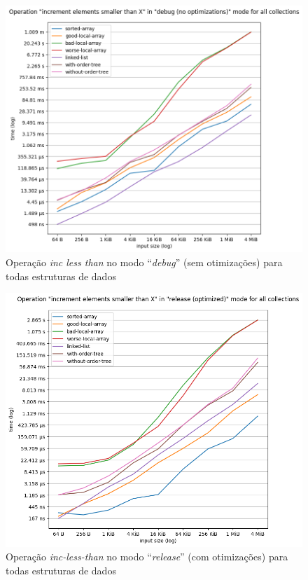 \documentclass[a4paper]{article}
\begin{document}
\begin{figure}
    \begin{center}
        \includegraphics[width=16cm, keepaspectratio]
        {../charts/collections-inc-less-than-debug.png}
    \end{center}
    \caption{Operação \textit{inc less than} no modo ``\textit{debug}''
        (sem otimizações) para todas estruturas de dados}
    \label{fig:collection inc less than debug}
\end{figure}

\begin{figure}
    \begin{center}
        \includegraphics[width=16cm, keepaspectratio]
        {../charts/collections-inc-less-than-release.png}
    \end{center}
    \caption{Operação \textit{inc-less-than} no modo ``\textit{release}''
        (com otimizações) para todas estruturas de dados}
    \label{fig:collection inc less than release}
\end{figure}
\end{document}
